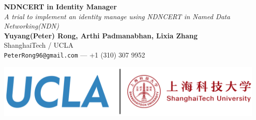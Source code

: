 \documentclass[a0,portrait]{poster}
\begin{document}


\begin{minipage}[b]{0.6\linewidth}
\veryHuge \color{NavyBlue} \textbf{NDNCERT in Identity Manager} \color{Black}\\ %
\Huge\textit{A trial to implement an identity manage using NDNCERT in Named Data Networking(NDN)}\\[2cm] %
\huge \textbf{Yuyang(Peter) Rong, Arthi Padmanabhan, Lixia Zhang}\\[0.5cm] %
\Large ShanghaiTech / UCLA \\ [0.4cm] %
\Large \texttt{PeterRong96@gmail.com} --- +1 (310) 307 9952\\
\end{minipage}
%
\begin{minipage}[b]{0.4\linewidth}
	\includegraphics[width=\linewidth]{figures/logo.png}\\
\end{minipage}

\vspace{0.7cm} %

\end{document}
